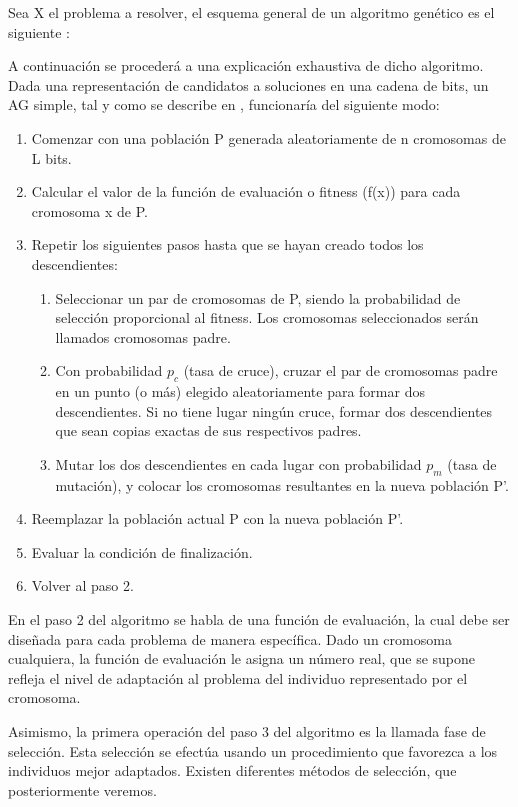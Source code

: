 \documentclass[runningheads]{llncs}
\begin{document}
Sea X el problema a resolver, el esquema general de un algoritmo genético es el siguiente \cite{Her03}:




A continuación se procederá a una explicación exhaustiva de dicho algoritmo.
Dada una representación de candidatos a soluciones en una cadena de bits, un AG simple, tal y como 
se describe en \cite{Mit98}, funcionaría del siguiente modo:

\begin{enumerate}
 \item Comenzar con una población P generada aleatoriamente de n cromosomas de L bits.
 \item Calcular el valor de la función de evaluación o fitness (f(x)) para cada cromosoma x de P.
 \item Repetir los siguientes pasos hasta que se hayan creado todos los  descendientes:
 \begin{enumerate}
    \item Seleccionar un par de cromosomas de P, siendo la probabilidad de selección proporcional al fitness.
    Los cromosomas seleccionados serán llamados cromosomas padre.
    \item Con probabilidad \textit{$p_c$} (tasa de cruce), cruzar el par de cromosomas padre en un punto (o más)
    elegido aleatoriamente para formar dos descendientes. Si no tiene lugar ningún cruce, formar dos descendientes que sean copias
    exactas de sus respectivos padres.
    \item Mutar los dos descendientes en cada lugar con probabilidad \textit{$p_m$} (tasa de mutación), y colocar 
    los cromosomas resultantes en la nueva población P'.
 \end{enumerate}
 \item Reemplazar la población actual P con la nueva población P'.
 \item Evaluar la condición de finalización.
 \item Volver al paso 2.

\end{enumerate}

En el paso 2 del algoritmo se habla de una función de evaluación, la cual debe ser diseñada para cada problema de manera 
específica. Dado un cromosoma cualquiera, la función de evaluación le asigna un número real, que se supone refleja el nivel de 
adaptación al problema del  individuo representado por el cromosoma. 

Asimismo, la primera operación del paso 3 del algoritmo es la llamada fase de selección. Esta selección se efectúa usando 
un procedimiento que favorezca a los individuos mejor adaptados. Existen diferentes métodos de selección, que posteriormente
veremos. 
\end{document}
